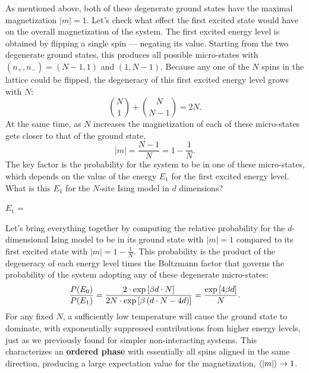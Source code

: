 As mentioned above, both of these degenerate ground states have the maximal magnetization $|m| = 1$.
Let's check what effect the first excited state would have on the overall magnetization of the system.
The first excited energy level is obtained by flipping a single spin --- negating its value.
Starting from the two degenerate ground states, this produces all possible micro-states with $(n_+, n_-) = (N - 1, 1)$ and $(1, N - 1)$.
Because any one of the $N$ spins in the lattice could be flipped, the degeneracy of this first excited energy level grows with $N$:
\begin{equation*}
  \binom{N}{1} + \binom{N}{N - 1} = 2N.
\end{equation*}
At the same time, as $N$ increases the magnetization of each of these micro-states gets closer to that of the ground state,
\begin{equation*}
  |m| = \frac{N - 1}{N} = 1 - \frac{1}{N}.
\end{equation*}
\newpage %
\noindent The key factor is the probability for the system to be in one of these micro-states, which depends on the value of the energy $E_1$ for the first excited energy level.
What is this $E_1$ for the $N$-site Ising model in $d$ dimensions?
\begin{mdframed}
  $\displaystyle E_1 = $ \\[100 pt]
\end{mdframed}

Let's bring everything together by computing the relative probability for the $d$-dimensional Ising model to be in its ground state with $|m| = 1$ compared to its first excited state with $|m| = 1 - \frac{1}{N}$.
This probability is the product of the degeneracy of each energy level times the Boltzmann factor that governs the probability of the system adopting any of these degenerate micro-states:
\begin{equation*}
  \frac{P(E_0)}{P(E_1)} = \frac{2\cdot \exp\left[\beta d\cdot N\right]}{2N\cdot \exp\left[\beta \left(d\cdot N - 4d\right)\right]} = \frac{\exp\left[4\beta d\right]}{N}.
\end{equation*}
For any fixed $N$, a sufficiently low temperature will cause the ground state to dominate, with exponentially suppressed contributions from higher energy levels, just as we previously found for simpler non-interacting systems.
This characterizes an \textbf{ordered phase} with essentially all spins aligned in the same direction, producing a large expectation value for the magnetization, $\left\langle |m| \right\rangle \to 1$.

